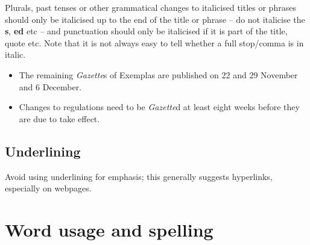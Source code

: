\documentclass[11pt,a4paper]{book}
\newcommand{\cmark}{{\color{green(html/cssgreen)}\checkmark}}%
\begin{document}
		Plurals, past tenses or other grammatical changes to italicised titles or phrases should only be italicised up to the end of the title or phrase -- do not italicise the \textbf{s}, \textbf{ed} etc -- and punctuation should only be italicised if it is part of the title, quote etc. Note that it is not always easy to tell whether a full stop/comma is in italic.
			{\firasans \begin{mdframed}[backgroundcolor=aliceblue] \begin{itemize}[label=\cmark]
				\item The remaining \textit{Gazette}s of Exemplas are published on 22 and 29 November and 6 December.
				\item Changes to regulations need to be \textit{Gazette}d at least eight weeks before they are due to take effect.
			\end{itemize} \end{mdframed} }	
		\section{Underlining}
		Avoid using underlining for emphasis; this generally suggests hyperlinks, especially on webpages.
		
		\chapter{Word usage and spelling}
\end{document}
